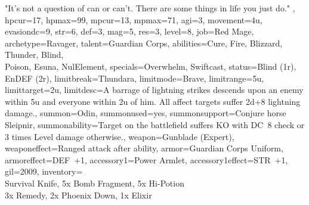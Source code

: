 \documentclass[a4paper, titlepage, 11pt, twocolumn] {article}
\begin{document}
{{		"It's not a question of can or can't. There are some things in life you just do."
	},
	hpcur=17, hpmax=99, mpcur=13, mpmax=71, agi=3, movement=4u, evasiondc=9, str=6, def=3, mag=5, res=3, 
	level=8, job=Red Mage, archetype=Ravager, talent=Guardian Corps,
	abilities={Cure, Fire, Blizzard, Thunder, Blind,\\ Poison, Esuna, NulElement},
	specials={Overwhelm, Swiftcast}, status={Blind (1r), EnDEF (2r)},
	limitbreak=Thundara, limitmode=Brave, limitrange=5u, limittarget=2u, 
	limitdesc={A barrage of lightning strikes descends upon an enemy within 5u and everyone within 2u of him. All affect targets suffer 2d+8 lightning damage.},
	summon=Odin, summonused=yes, summonsupport={Conjure horse Sleipnir}, summonability={Target on the battlefield suffers KO with DC~8 check or 3 times Level damage otherwise.},
	weapon=Gunblade (Expert), weaponeffect=Ranged attack after ability, armor=Guardian Corps Uniform, armoreffect=DEF~+1, accessory1=Power Armlet, accessory1effect=STR~+1,
	gil=2009, inventory={\\Survival Knife, 5x Bomb Fragment, 5x Hi-Potion\\ 3x Remedy, 2x Phoenix Down, 1x Elixir}
}
\clearpage
%
\end{document}
